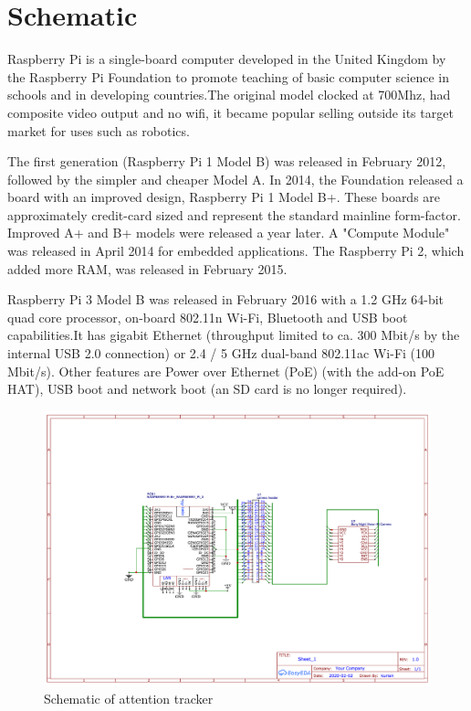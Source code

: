 \section{Schematic}

Raspberry Pi is a single-board computer developed in the United Kingdom by the Raspberry Pi Foundation to promote teaching of basic computer science in schools and in developing countries.The original model clocked at 700Mhz, had composite video output and no wifi, it became popular selling outside its target market for uses such as robotics. 

The first generation (Raspberry Pi 1 Model B) was released in February 2012, followed by the simpler and cheaper Model A. In 2014, the Foundation released a board with an improved design, Raspberry Pi 1 Model B+. These boards are approximately credit-card sized and represent the standard mainline form-factor. Improved A+ and B+ models were released a year later. A "Compute Module" was released in April 2014 for embedded applications. The Raspberry Pi 2, which added more RAM, was released in February 2015.

Raspberry Pi 3 Model B was released in February 2016 with a 1.2 GHz 64-bit quad core processor, on-board 802.11n Wi-Fi, Bluetooth and USB boot capabilities.It has gigabit Ethernet (throughput limited to ca. 300 Mbit/s by the internal USB 2.0 connection) or 2.4 / 5 GHz dual-band 802.11ac Wi-Fi (100 Mbit/s). Other features are Power over Ethernet (PoE) (with the add-on PoE HAT), USB boot and network boot (an SD card is no longer required).
\begin{figure}[!htbp]
\centering
\includegraphics[scale=0.15]{project}
\caption{Schematic of attention tracker}
\end{figure}
